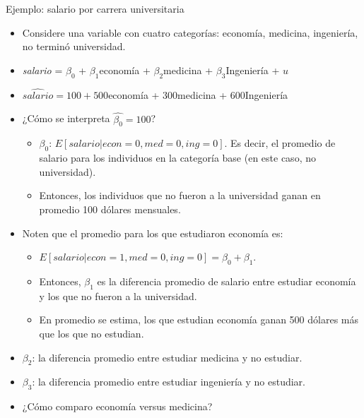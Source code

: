 \documentclass{beamer}
\begin{document}
\begin{frame}[shrink=10, t]{Ejemplo: salario por carrera universitaria}
    \begin{itemize}
        \item Considere una variable con cuatro categorías: economía, medicina, ingeniería, no terminó universidad.
        \item \textit{salario} = \(\beta_0\) + \(\beta_1\)economía + \(\beta_2\)medicina + \(\beta_3\)Ingeniería + \(u\)
        \item \(\hat{salario} = 100 + 500\)economía + 300medicina + 600Ingeniería
        \item ¿Cómo se interpreta \(\hat{\beta_0} = 100\)?
        \begin{itemize}
            \item \(\beta_0\): \(E[salario|econ = 0, med = 0, ing = 0]\). Es decir, el promedio de salario para los individuos en la categoría base (en este caso, no universidad).
            \item Entonces, los individuos que no fueron a la universidad ganan en promedio 100 dólares mensuales.
        \end{itemize}
        \item Noten que el promedio para los que estudiaron economía es:
        \begin{itemize}
            \item \(E[salario|econ = 1, med = 0, ing = 0] = \beta_0 + \beta_1\).
            \item Entonces, \(\beta_1\) es la diferencia promedio de salario entre estudiar economía y los que no fueron a la universidad.
            \item En promedio se estima, los que estudian economía ganan 500 dólares más que los que no estudian.
        \end{itemize}
        \item \(\beta_2\): la diferencia promedio entre estudiar medicina y no estudiar.
        \item \(\beta_3\): la diferencia promedio entre estudiar ingeniería y no estudiar.
        \item ¿Cómo comparo economía versus medicina?
    \end{itemize}
\end{frame}
\end{document}
